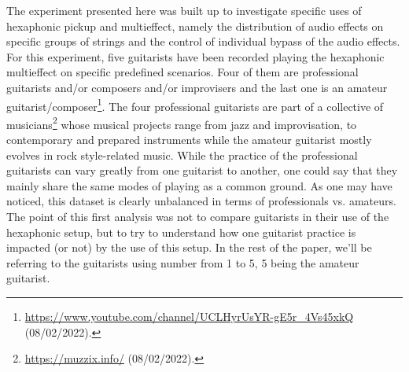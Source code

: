\documentclass{article}
\begin{document}
The experiment presented here was built up to investigate specific uses of hexaphonic pickup and multieffect, name\-ly the distribution of audio effects on specific groups of strings and the control of individual bypass of the audio effects. 
For this experiment, five guitarists have been recorded playing the hexaphonic multieffect on specific predefined scenarios. Four of them are professional guitarists and/or composers and/or improvisers and the last one is an amateur guitarist/composer\footnote{\url{https://www.youtube.com/channel/UCLHyrUsYR-gE5r\_4Vs45xkQ} (08/02/2022).}. The four professional guitarists are part of a collective of musicians\footnote{\url{https://muzzix.info/} (08/02/2022).} whose musical pro\-jects range from jazz and improvisation, to contemporary and prepared instruments while the amateur guitarist most\-ly evolves in rock style-related music. While the practice of the professional guitarists can vary greatly from one guitarist to another, one could say that they mainly share the same modes of playing as a common ground. As one may have noticed, this dataset is clearly unbalanced in terms of professionals vs. amateurs. The point of this first analysis was not to compare guitarists in their use of the hexaphonic setup, but to try to understand how one guitarist practice is impacted (or not) by the use of this setup. In the rest of the paper, we'll be referring to the guitarists using number from 1 to 5, 5 being the amateur guitarist. 
\end{document}
